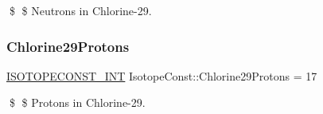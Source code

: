 \$ \$ Neutrons in Chlorine-\/29. \mbox{\label{group___isotope_const-_chlorine-_cl29_gabd82682f4992d4d902ebc97614a12ec0}} 
\subsubsection{\texorpdfstring{Chlorine29\+Protons}{Chlorine29Protons}}
{\footnotesize\ttfamily \mbox{\hyperlink{group___isotope_const-_macros_ga5f18360b3e99483a35c32d789e62621c}{I\+S\+O\+T\+O\+P\+E\+C\+O\+N\+S\+T\+\_\+\+I\+NT}} Isotope\+Const\+::\+Chlorine29\+Protons = 17}

\$ \$ Protons in Chlorine-\/29. 